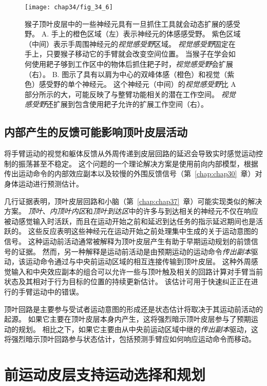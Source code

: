 \begin{figure}[htbp]
	\centering
	\texttt{[image: chap34/fig\_34\_6]}
	\caption{猴子顶叶皮层中的一些神经元具有一旦抓住工具就会动态扩展的感受野\cite{maravita2004tools}。
		A. 手上的橙色区域（左）表示神经元的体感感受野。
		紫色区域（中间）表示手周围神经元的\textit{视觉感受野}区域。
		\textit{视觉感受野}固定在手上，只要猴子移动它的手臂就会改变空间位置。
		当猴子在学会如何使用耙子够到工作区中的物体后抓住耙子时，\textit{视觉感受野}会扩展（右）。
		B. 图示了具有以肩为中心的双峰体感（橙色）和视觉（紫色）感受野的单个神经元。
		这个神经元（中间）的\textit{视觉感受野}比 A 部分所示的大，可能反映了与整臂功能相关的潜在工作空间。
		\textit{视觉感受野}还扩展到包含使用耙子允许的扩展工作空间（右）。}
	\label{fig:34_6}
\end{figure}



\subsection{内部产生的反馈可能影响顶叶皮层活动}

将手臂运动的视觉和躯体反馈从外周传递到皮层回路的延迟会导致实时感觉运动控制的振荡甚至不稳定。
这个问题的一个理论解决方案是使用前向内部模型，根据传出运动命令的内部效应副本以及较慢的外围反馈信号（第~\ref{chap:chap30}~章）对身体运动进行预测估计。


几行证据表明，顶叶皮层回路和小脑（第~\ref{chap:chap37}~章）可能实现类似的解决方案。
\textit{顶叶}、\textit{内顶叶内区}和\textit{顶叶到达区}中的许多与到达相关的神经元不仅在响应被动感觉输入时活跃，而且在运动开始之前和延迟到达任务的指示延迟期间也是活跃的。
这些反应表明这些神经元在运动开始之前处理集中生成的关于运动意图的信号。
这种运动前活动通常被解释为顶叶皮层产生有助于早期运动规划的前馈信号的证据。
然而，另一种解释是运动前活动是由预期运动的运动命令\textit{传出副本}驱动，该运动命令通过与中央前运动区域的相互连接传输到顶叶皮层。
这种外周感觉输入和中央效应副本的组合可以允许一些与顶叶触及相关的回路计算对手臂当前状态及其相对于行为目标的位置的持续更新估计。
该估计可用于快速纠正正在进行的手臂运动中的错误。


顶叶回路是主要参与受试者运动意图的形成还是状态估计将取决于其运动前活动的起源。
如果它主要在顶叶皮层本身内产生，这将强烈暗示顶叶皮层参与了预期运动的规划。
相比之下，如果它主要由从中央前运动区域中继的\textit{传出副本}驱动，这将强烈暗示顶叶回路参与状态估计，包括预测手臂应如何响应运动命令而移动。



\section{前运动皮层支持运动选择和规划}

